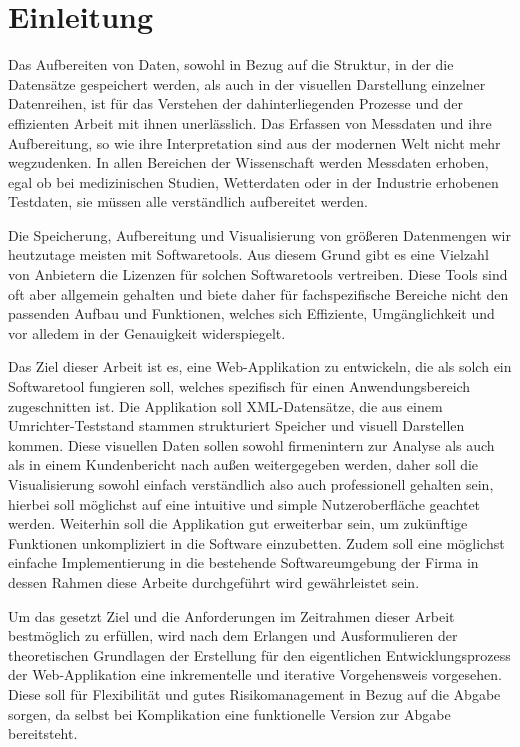 


\newpage
\section{Einleitung}
\label{Einleitung}
Das Aufbereiten von
Daten, sowohl in Bezug auf die Struktur, in der die Datensätze gespeichert werden,
als auch in der visuellen Darstellung einzelner Datenreihen, ist für das
Verstehen der dahinterliegenden Prozesse und der effizienten Arbeit mit ihnen unerlässlich.
Das Erfassen von Messdaten und ihre Aufbereitung, so wie ihre Interpretation
sind aus der modernen Welt nicht mehr wegzudenken. In allen Bereichen der
Wissenschaft werden Messdaten erhoben, egal ob bei medizinischen Studien,
Wetterdaten oder in der Industrie erhobenen Testdaten, sie müssen alle
verständlich aufbereitet werden.



Die Speicherung,
Aufbereitung und Visualisierung von größeren Datenmengen wir heutzutage meisten
mit Softwaretools. Aus diesem Grund gibt es eine Vielzahl von Anbietern die
Lizenzen für solchen Softwaretools vertreiben. Diese Tools sind oft aber
allgemein gehalten und biete daher für fachspezifische Bereiche nicht den
passenden Aufbau und Funktionen, welches sich Effiziente, Umgänglichkeit und
vor alledem in der Genauigkeit widerspiegelt.



Das Ziel dieser Arbeit
ist es, eine Web-Applikation zu entwickeln, die als solch ein Softwaretool
fungieren soll, welches spezifisch für einen Anwendungsbereich zugeschnitten
ist. Die Applikation soll XML-Datensätze, die aus einem Umrichter-Teststand
stammen strukturiert Speicher und visuell Darstellen kommen. Diese visuellen
Daten sollen sowohl firmenintern zur Analyse als auch als in einem
Kundenbericht nach außen weitergegeben werden, daher soll die Visualisierung sowohl
einfach verständlich also auch professionell gehalten sein, hierbei soll
möglichst auf eine intuitive und simple Nutzeroberfläche geachtet werden.
Weiterhin soll die Applikation gut erweiterbar sein, um zukünftige Funktionen
unkompliziert in die Software einzubetten. Zudem soll eine möglichst einfache
Implementierung in die bestehende Softwareumgebung der Firma in dessen Rahmen
diese Arbeite durchgeführt wird gewährleistet sein.



Um das gesetzt Ziel und
die Anforderungen im Zeitrahmen dieser Arbeit bestmöglich zu erfüllen, wird nach
dem Erlangen und Ausformulieren der theoretischen Grundlagen der Erstellung für
den eigentlichen Entwicklungsprozess der Web-Applikation eine inkrementelle und
iterative Vorgehensweis vorgesehen. Diese soll für Flexibilität und gutes
Risikomanagement in Bezug auf die Abgabe sorgen, da selbst bei Komplikation
eine funktionelle Version zur Abgabe bereitsteht.



